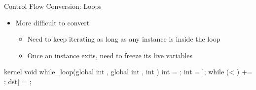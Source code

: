 
\begin{frame}[fragile]{Control Flow Conversion: Loops}

\begin{minipage}[t]{0.45\linewidth}

\begin{itemize}
    \item More difficult to convert
    \begin{itemize}
        \item Need to keep iterating as long as any instance is inside the loop
        \item Once an instance exits, need to freeze its live variables
    \end{itemize}
\end{itemize}

\begin{codebox}[commandchars=\\\[\]]
kernel void while_loop(global int \uniform[*src],
                       global int \uniform[*dst],
                       int \uniform[step]) {
  int \varying[tid] = ;
  int \varying[val] = \uniform[src]\idx[\varying[tid]];
  while (\varying[val] < \uniform[0]) {
    \varying[val] += \uniform[step];
  }
  dst\idx[\varying[tid]] = \varying[val];
}
\end{codebox}

\end{minipage}
\hspace{1em}
\begin{minipage}[t]{0.43\linewidth}

\vspace{0.1ex}



\end{minipage}
\end{frame}

